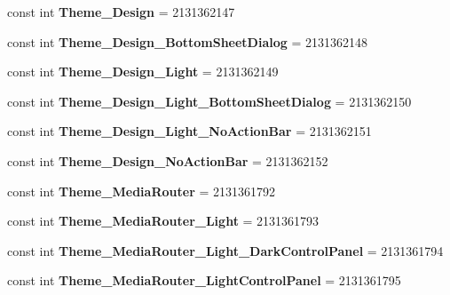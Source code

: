\begin{DoxyCompactItemize}
const int {\bfseries Theme\+\_\+\+Design} = 2131362147
\item 
\mbox{\label{classXaria_1_1Resource_1_1Style_ac3f3909b33b672e2f3aa3fbea71baa11}} 
const int {\bfseries Theme\+\_\+\+Design\+\_\+\+Bottom\+Sheet\+Dialog} = 2131362148
\item 
\mbox{\label{classXaria_1_1Resource_1_1Style_a95e8bb2db89c9ede7e34c700400bf0fd}} 
const int {\bfseries Theme\+\_\+\+Design\+\_\+\+Light} = 2131362149
\item 
\mbox{\label{classXaria_1_1Resource_1_1Style_a0edae57029a11088c5d496cc7c94eb73}} 
const int {\bfseries Theme\+\_\+\+Design\+\_\+\+Light\+\_\+\+Bottom\+Sheet\+Dialog} = 2131362150
\item 
\mbox{\label{classXaria_1_1Resource_1_1Style_ab51da7e66e762591326f3965db00d60a}} 
const int {\bfseries Theme\+\_\+\+Design\+\_\+\+Light\+\_\+\+No\+Action\+Bar} = 2131362151
\item 
\mbox{\label{classXaria_1_1Resource_1_1Style_aafb4a3c95326e8ce42ff9622034bce75}} 
const int {\bfseries Theme\+\_\+\+Design\+\_\+\+No\+Action\+Bar} = 2131362152
\item 
\mbox{\label{classXaria_1_1Resource_1_1Style_a413b23d2a1265203d3ef557106a974c1}} 
const int {\bfseries Theme\+\_\+\+Media\+Router} = 2131361792
\item 
\mbox{\label{classXaria_1_1Resource_1_1Style_ab3320feaf57f405667b159945abe644b}} 
const int {\bfseries Theme\+\_\+\+Media\+Router\+\_\+\+Light} = 2131361793
\item 
\mbox{\label{classXaria_1_1Resource_1_1Style_a381b84266fb9b9c28ec66567c07eeb63}} 
const int {\bfseries Theme\+\_\+\+Media\+Router\+\_\+\+Light\+\_\+\+Dark\+Control\+Panel} = 2131361794
\item 
\mbox{\label{classXaria_1_1Resource_1_1Style_af4b0e216eae4a16970baf18dbf399b84}} 
const int {\bfseries Theme\+\_\+\+Media\+Router\+\_\+\+Light\+Control\+Panel} = 2131361795

\end{DoxyCompactItemize}
